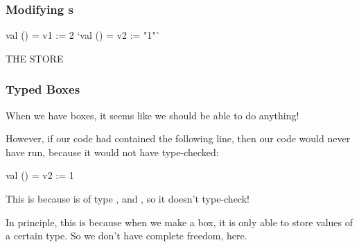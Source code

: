 \documentclass[aspectratio=169, handout]{beamer}
\begin{document}
\begin{frame}[fragile]
  \frametitle{Modifying s}

  \begin{center}
    \begin{minipage}[t][2.5in][t]{0.55\textwidth}
      \vspace{\fill}
      \begin{codeblock}
        val () = v1 := 2
        `val () = v2 := "1"`
      \end{codeblock}
      \vspace{\fill}
    \end{minipage}
    \hfill\vline\hfill
    \begin{minipage}[t][2.5in][t]{0.35\textwidth}
      \centering
      {\hspace{-20pt}\color{gray} \large THE STORE}

      \vspace{\fill}
      \vspace{\fill}
    \end{minipage}
  \end{center}
\end{frame}

\begin{frame}[fragile]
  \frametitle{Typed Boxes}

  When we have boxes, it seems like we should be able to do anything!

  \pause
  \vspace{\fill}

  However, if our code had contained the following line, then our code
  would never have run, because it would not have type-checked:
  \begin{codeblock}
    val () = v2 := 1
  \end{codeblock}

  \pause
  \vspace{\fill}

  This is because  is of type , and
  , so it doesn't type-check!

  \pause
  \vspace{\fill}

  In principle, this is because when we make a box, it is only able to store
  values of a certain type. So we don't have complete freedom, here.
\end{frame}
\end{document}

